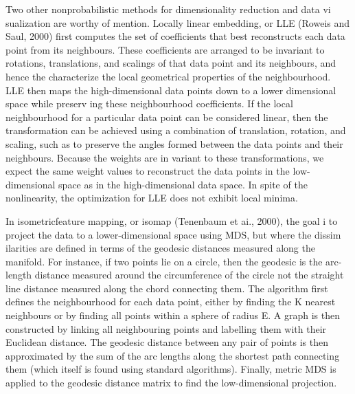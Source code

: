 \documentclass[
  10
]{article}
\begin{document}
Two other nonprobabilistic methods for dimensionality reduction and data
vi sualization are worthy of mention. Locally linear embedding, or LLE
(Roweis and Saul, 2000) first computes the set of coefficients that best
reconstructs each data point from its neighbours. These coefficients are
arranged to be invariant to rotations, translations, and scalings of
that data point and its neighbours, and hence the characterize the local
geometrical properties of the neighbourhood. LLE then maps the
high-dimensional data points down to a lower dimensional space while
preserv ing these neighbourhood coefficients. If the local neighbourhood
for a particular data point can be considered linear, then the
transformation can be achieved using a combination of translation,
rotation, and scaling, such as to preserve the angles formed between the
data points and their neighbours. Because the weights are in variant to
these transformations, we expect the same weight values to reconstruct
the data points in the low-dimensional space as in the high-dimensional
data space. In spite of the nonlinearity, the optimization for LLE does
not exhibit local minima.

In isometricfeature mapping, or isomap (Tenenbaum et ai., 2000), the
goal i to project the data to a lower-dimensional space using MDS, but
where the dissim ilarities are defined in terms of the geodesic
distances measured along the manifold. For instance, if two points lie
on a circle, then the geodesic is the arc-length distance measured
around the circumference of the circle not the straight line distance
measured along the chord connecting them. The algorithm first defines
the neighbourhood for each data point, either by finding the K nearest
neighbours or by finding all points within a sphere of radius E. A graph
is then constructed by linking all neighbouring points and labelling
them with their Euclidean distance. The geodesic distance between any
pair of points is then approximated by the sum of the arc lengths along
the shortest path connecting them (which itself is found using standard
algorithms). Finally, metric MDS is applied to the geodesic distance
matrix to find the low-dimensional projection.
\end{document}

